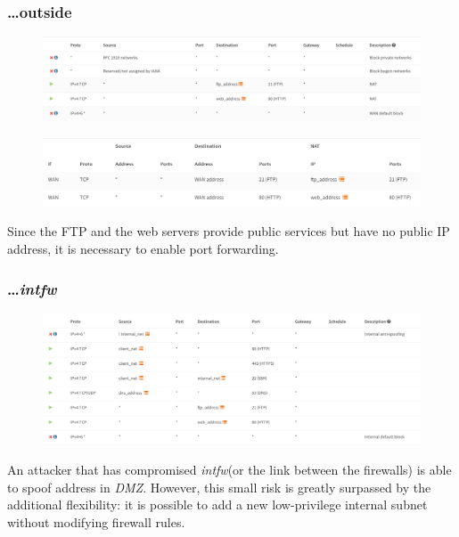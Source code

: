 \documentclass[draft]{homework}
\newcommand{\dmz}{\textit{DMZ}\xspace}
\newcommand{\intfw}{\textit{intfw}\xspace}
\begin{document}
    \subsubsection{\dots outside}
    \begin{figure}[H]
        \centering
        \includegraphics[width=\linewidth]{images/mainfw-wan}
        \label{fig:mainfw-wan}
    \end{figure}
    
    \begin{figure}[H]
        \centering
        \includegraphics[width=\linewidth]{images/mainfw-portforwarding}
        \label{fig:mainfw-portforwarding}
    \end{figure}
    Since the FTP and the web servers provide public services but have no public IP address, it is necessary to enable port forwarding.
    
    \subsubsection{\dots \intfw}
    \begin{figure}[H]
        \centering
        \includegraphics[width=\linewidth]{images/mainfw-internal}
        \label{fig:mainfw-internal}
    \end{figure}
    An attacker that has compromised \intfw (or the link between the firewalls) is able to spoof address in \dmz.
    However, this small risk is greatly surpassed by the additional flexibility: it is possible to add a new low-privilege internal subnet without modifying firewall rules.
    
\end{document}

